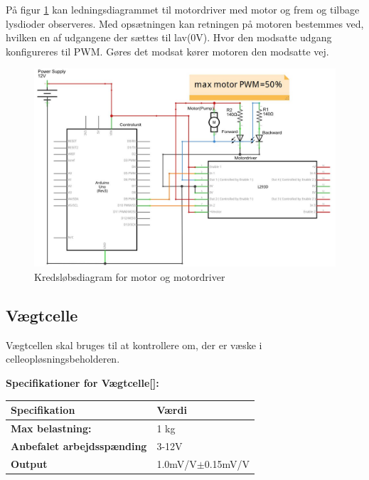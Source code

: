 På figur \ref{fig:motordriverdiagram} kan ledningsdiagrammet til motordriver med motor og frem og tilbage lysdioder observeres. Med opsætningen kan retningen på motoren bestemmes ved, hvilken en af udgangene der sættes til lav(0V). Hvor den modsatte udgang konfigureres til PWM. Gøres det modsat kører motoren den modsatte vej.
 
 \begin{figure}[H]
	\centering
	\includegraphics[width=1\textwidth]{billeder/Hardware/diagrammer/motordiagram.JPG}
	\caption{Kredsløbsdiagram for motor og motordriver}
	\label{fig:motordriverdiagram}
\end{figure}


\subsection{Vægtcelle}
\label{subsec:loadcell}
Vægtcellen skal bruges til at kontrollere om, der er væske i celleopløsningsbeholderen.

\textbf{Specifikationer for Vægtcelle[\citet{DH7}]:} 
\begin{center}
		\begin{longtable}{ | m{6.5cm} | m{6.5cm}| } 
			\hline
			\textbf{Specifikation} &\textbf{Værdi} \\ 
			\hline
			\textbf{Max belastning:} & 1 kg \\ 
			\hline
			\textbf{Anbefalet arbejdsspænding} & 3-12V \\ 
			\hline
			\textbf{Output} & 1.0mV/V$\pm$0.15mV/V \\ 
			\hline
		\end{longtable}
\end{center}

